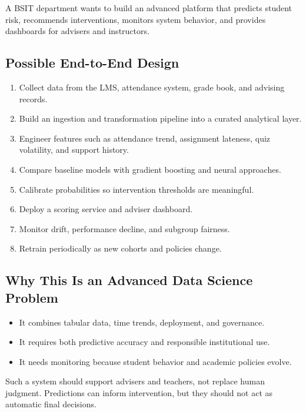 \documentclass[11pt,a4paper]{article}
\begin{document}
\begin{definitionbox}[Scenario]
A BSIT department wants to build an advanced platform that predicts student risk, recommends interventions, monitors system behavior, and provides dashboards for advisers and instructors.
\end{definitionbox}

\subsection{Possible End-to-End Design}

\begin{enumerate}[leftmargin=*]
  \item Collect data from the LMS, attendance system, grade book, and advising records.
  \item Build an ingestion and transformation pipeline into a curated analytical layer.
  \item Engineer features such as attendance trend, assignment lateness, quiz volatility, and support history.
  \item Compare baseline models with gradient boosting and neural approaches.
  \item Calibrate probabilities so intervention thresholds are meaningful.
  \item Deploy a scoring service and adviser dashboard.
  \item Monitor drift, performance decline, and subgroup fairness.
  \item Retrain periodically as new cohorts and policies change.
\end{enumerate}

\subsection{Why This Is an Advanced Data Science Problem}

\begin{itemize}[leftmargin=*]
  \item It combines tabular data, time trends, deployment, and governance.
  \item It requires both predictive accuracy and responsible institutional use.
  \item It needs monitoring because student behavior and academic policies evolve.
\end{itemize}

\begin{alertbox}
Such a system should support advisers and teachers, not replace human judgment. Predictions can inform intervention, but they should not act as automatic final decisions.
\end{alertbox}
\end{document}
